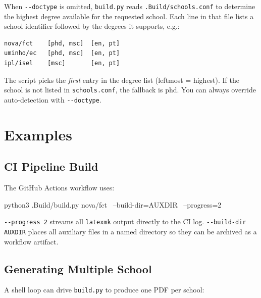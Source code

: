 When \verb!--doctype! is omitted, \texttt{build.py} reads
\verb!.Build/schools.conf! to determine the highest degree available for the
requested school.  Each line in that file lists a school identifier followed
by the degrees it supports, e.g.:

\begin{verbatim}
nova/fct    [phd, msc]  [en, pt]
uminho/ec   [phd, msc]  [en, pt]
ipl/isel    [msc]       [en, pt]
\end{verbatim}

The script picks the \emph{first} entry in the degree list (leftmost = highest).
If the school is not listed in \verb!schools.conf!, the fallback is
\gls{phd}.  You can always override auto-detection with \verb!--doctype!.


\section{Examples}
\label{sec:buildpy_examples}

\subsection{CI Pipeline Build}
\label{sec:buildpy_ci}

The GitHub Actions workflow uses:

\begin{bashcode}
python3 .Build/build.py nova/fct \
    --build-dir=AUXDIR \
    --progress=2
\end{bashcode}

\verb!--progress 2! streams all \texttt{latexmk} output directly to the
\gls{CI} log.  \verb!--build-dir AUXDIR! places all auxiliary files in a named
directory so they can be archived as a workflow artifact.

\subsection{Generating Multiple School }
\label{sec:buildpy_multi}

A shell loop can drive \texttt{build.py} to produce one \gls{PDF} per school:

